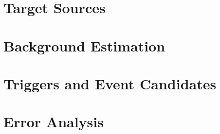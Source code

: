 
\section{Target Sources}

\section{Background Estimation}

\section{Triggers and Event Candidates}

\section{Error Analysis}

